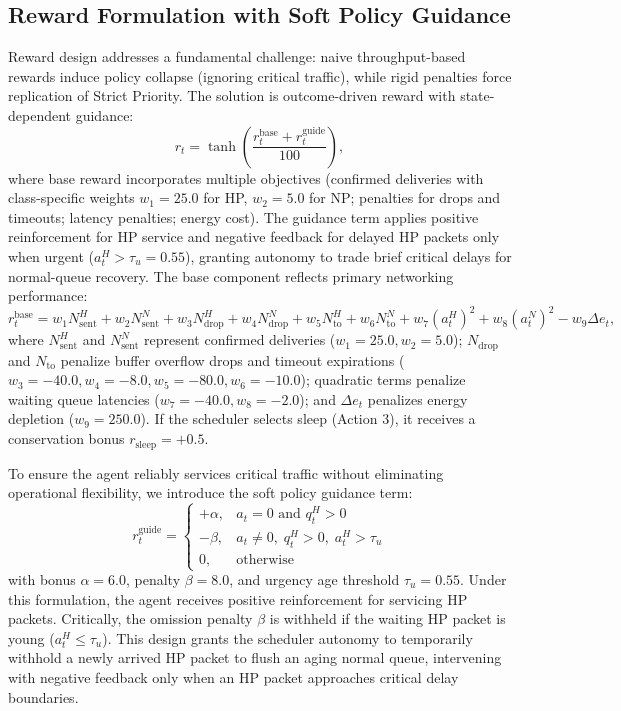 \documentclass[runningheads,a4paper]{llncs}
\begin{document}
\subsection{Reward Formulation with Soft Policy Guidance}
Reward design addresses a fundamental challenge: naive throughput-based rewards induce policy collapse (ignoring critical traffic), while rigid penalties force replication of Strict Priority. The solution is outcome-driven reward with state-dependent guidance:
\begin{equation}
r_t = \tanh\left(\frac{r_t^{\text{base}} + r_t^{\text{guide}}}{100}\right),
\end{equation}
where base reward incorporates multiple objectives (confirmed deliveries with class-specific weights $w_1=25.0$ for HP, $w_2=5.0$ for NP; penalties for drops and timeouts; latency penalties; energy cost). The guidance term applies positive reinforcement for HP service and negative feedback for delayed HP packets only when urgent ($a_t^H > \tau_u = 0.55$), granting autonomy to trade brief critical delays for normal-queue recovery.
The base component reflects primary networking performance:
\begin{equation}
r_t^{\text{base}} = w_1 N_{\text{sent}}^H + w_2 N_{\text{sent}}^N + w_3 N_{\text{drop}}^H + w_4 N_{\text{drop}}^N + w_5 N_{\text{to}}^H + w_6 N_{\text{to}}^N + w_7 (a_t^H)^2 + w_8 (a_t^N)^2 - w_9 \Delta e_t,
\end{equation}
where $N_{\text{sent}}^H$ and $N_{\text{sent}}^N$ represent confirmed deliveries ($w_1 = 25.0, w_2 = 5.0$); $N_{\text{drop}}$ and $N_{\text{to}}$ penalize buffer overflow drops and timeout expirations ($w_3 = -40.0, w_4 = -8.0, w_5 = -80.0, w_6 = -10.0$); quadratic terms penalize waiting queue latencies ($w_7 = -40.0, w_8 = -2.0$); and $\Delta e_t$ penalizes energy depletion ($w_9 = 250.0$). If the scheduler selects sleep (Action 3), it receives a conservation bonus $r_{\text{sleep}} = +0.5$.

To ensure the agent reliably services critical traffic without eliminating operational flexibility, we introduce the soft policy guidance term:
\begin{equation}
r_t^{\text{guide}}=
\begin{cases}
+\alpha, & a_t = 0 \text{ and } q_t^H > 0\\
-\beta, & a_t \neq 0,\; q_t^H > 0,\; a_t^H > \tau_u\\
0, & \text{otherwise}
\end{cases}
\end{equation}
with bonus $\alpha = 6.0$, penalty $\beta = 8.0$, and urgency age threshold $\tau_u = 0.55$. Under this formulation, the agent receives positive reinforcement for servicing HP packets. Critically, the omission penalty $\beta$ is withheld if the waiting HP packet is young ($a_t^H \le \tau_u$). This design grants the scheduler autonomy to temporarily withhold a newly arrived HP packet to flush an aging normal queue, intervening with negative feedback only when an HP packet approaches critical delay boundaries.
\end{document}
